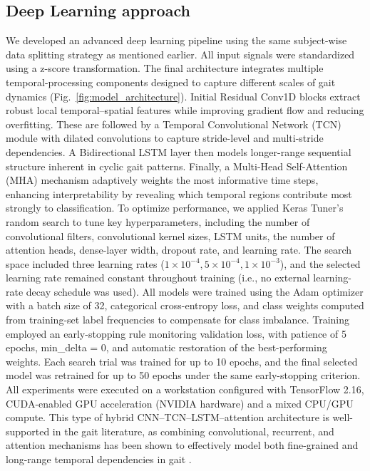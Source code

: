\documentclass[sensors,article,submit,pdftex,moreauthors]{Definitions/mdpi}
\begin{document}
\subsection{Deep Learning approach}
\textcolor{revision}{We developed an advanced deep learning pipeline using the same subject-wise data splitting strategy as mentioned earlier. All input \textcolor{revision}{signals} were standardized using a z-score transformation. The final architecture integrates multiple temporal-processing components designed to capture different scales of gait dynamics (Fig.~\ref{fig:model_architecture}). Initial Residual Conv1D blocks extract robust local temporal–spatial features while improving gradient flow and reducing overfitting. These are followed by a Temporal Convolutional Network (TCN) module with dilated convolutions to capture stride-level and multi-stride dependencies. A Bidirectional LSTM layer then models longer-range sequential structure inherent in cyclic gait patterns. Finally, a Multi-Head Self-Attention (MHA) mechanism adaptively weights the most informative time steps, enhancing interpretability by revealing which temporal regions contribute most strongly to classification. To optimize performance, we applied Keras Tuner’s random search to tune key hyperparameters, including the number of convolutional filters, convolutional kernel sizes, LSTM units, the number of attention heads, dense-layer width, dropout rate, and learning rate. \textcolor{revision2}{The search space included three learning rates ($1 \times 10^{-4}, 5 \times 10^{-4}, 1 \times 10^{-3}$), and the selected learning rate remained constant throughout training (i.e., no external learning-rate decay schedule was used). All models were trained using the Adam optimizer with a batch size of 32, categorical cross-entropy loss, and class weights computed from training-set label frequencies to compensate for class imbalance. Training employed an early-stopping rule monitoring validation loss, with patience of 5 epochs, min\_delta = 0, and automatic restoration of the best-performing weights. Each search trial was trained for up to 10 epochs, and the final selected model was retrained for up to 50 epochs under the same early-stopping criterion. All experiments were executed on a workstation configured with TensorFlow 2.16, CUDA-enabled GPU acceleration (NVIDIA hardware) and a mixed CPU/GPU compute}. This type of hybrid CNN–TCN–LSTM–attention architecture is well-supported in the gait literature, as combining convolutional, recurrent, and attention mechanisms has been shown to effectively model both fine-grained and long-range temporal dependencies in gait \cite{burges2024gait, 10862239, LV2025199}.}
\end{document}

